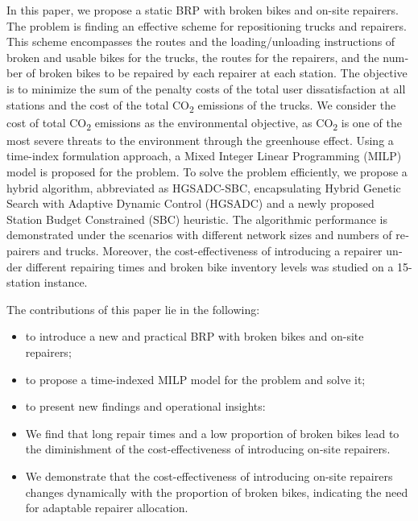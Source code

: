\documentclass[
  english,
]{article}
\begin{document}
\begin{otherlanguage}{english}
\protect{}\label{p0055}
In this paper, we propose a static BRP with broken bikes and on-site repairers. The problem is
finding an effective scheme for repositioning trucks and repairers. This scheme encompasses the
routes and the loading/unloading instructions of broken and usable bikes for the trucks, the routes
for the repairers, and the number of broken bikes to be repaired by each repairer at each station.
The objective is to minimize the sum of the penalty costs of the total user dissatisfaction at all
stations and the cost of the total CO\textsubscript{2} emissions of the trucks. We consider the cost
of total CO\textsubscript{2} emissions as the environmental objective, as CO\textsubscript{2} is one
of the most severe threats to the environment through the greenhouse effect. Using a time-index
formulation approach, a Mixed Integer Linear Programming (MILP) model is proposed for the problem.
To solve the problem efficiently, we propose a hybrid algorithm, abbreviated as HGSADC-SBC,
encapsulating Hybrid Genetic Search with Adaptive Dynamic Control (HGSADC) and a newly proposed
Station Budget Constrained (SBC) heuristic. The algorithmic performance is demonstrated under the
scenarios with different network sizes and numbers of repairers and trucks. Moreover, the
cost-effectiveness of introducing a repairer under different repairing times and broken bike
inventory levels was studied on a 15-station instance.

\protect{}\label{p0060}
The contributions of this paper lie in the following:

\begin{itemize}
\item
  \protect{}\label{p0065}
  to introduce a new and practical BRP with broken bikes and on-site repairers;
\item
  \protect{}\label{p0070}
  to propose a time-indexed MILP model for the problem and solve it;
\item
  \protect{}\label{p0075}
  to present new findings and operational insights:
\item
  \protect{}\label{p0080}
  We find that long repair times and a low proportion of broken bikes lead to the diminishment of
  the cost-effectiveness of introducing on-site repairers.
\item
  \protect{}\label{p0085}
  We demonstrate that the cost-effectiveness of introducing on-site repairers changes dynamically
  with the proportion of broken bikes, indicating the need for adaptable repairer allocation.
\end{itemize}


\end{otherlanguage}
\end{document}
